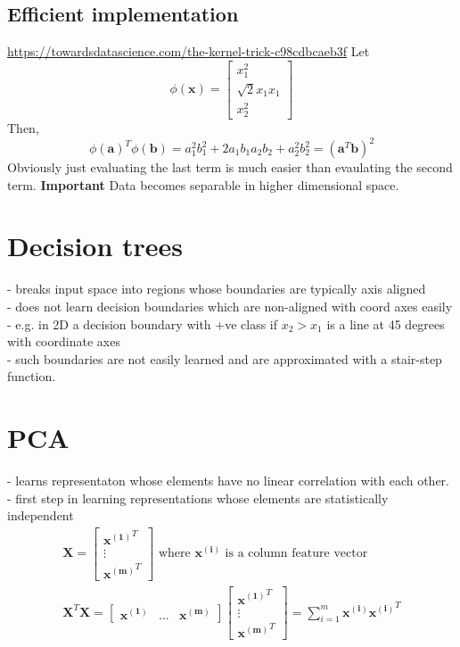 \documentclass{article}
\newcommand{\beq}{\begin{equation}}
\newcommand{\eeq}{\end{equation}}
\newcommand{\ber}{\begin{eqnarray}}
\newcommand{\eer}{\end{eqnarray}}
\begin{document}
\subsection{Efficient implementation}
\url{https://towardsdatascience.com/the-kernel-trick-c98cdbcaeb3f}
Let
\beq
\phi(\pmb{x}) = \begin{bmatrix} x_1^2\\\sqrt{2}x_1x_1\\x_2^2\end{bmatrix}
\eeq
Then,
\beq
\phi(\pmb{a})^T\phi(\pmb{b}) = a_1^2b_1^2 + 2a_1b_1a_2b_2 + a_2^2b_2^2 = (\pmb{a}^T\pmb{b})^2
\eeq
Obviously just evaluating the last term is much easier than evaulating the second term.
\textbf{Important} Data becomes separable in higher dimensional space.
\section{Decision trees}
- breaks input space into regions whose boundaries are typically axis aligned \\
- does not learn decision boundaries which are non-aligned with coord axes easily\\
- e.g. in 2D a decision boundary with +ve class if $x_2>x_1$ is a line at 45 degrees with coordinate axes\\
- such boundaries are not easily learned and are approximated with a stair-step function.
\section{PCA}
- learns representaton whose elements have no linear correlation with each other.\\
- first step in learning representations whose elements are statistically independent\\
\ber
\pmb{X} = \begin{bmatrix}\pmb{x^{(1)}}^T\\\vdots\\\pmb{x^{(m)}}^T\end{bmatrix} \text{ where } \pmb{x^{(i)}} \text{ is a column feature vector}\\
\pmb{X}^T\pmb{X} = \begin{bmatrix}\pmb{x^{(1)}}& \hdots & \pmb{x^{(m)}}\end{bmatrix}\begin{bmatrix}\pmb{x^{(1)}}^T\\\vdots\\\pmb{x^{(m)}}^T\end{bmatrix} = \sum_{i=1}^{m}\pmb{x^{(i)}}\pmb{x^{(i)}}^T
  \eer
\end{document}
